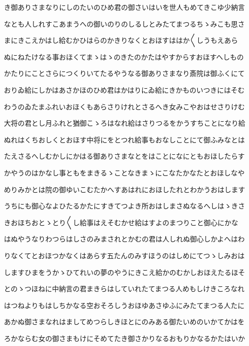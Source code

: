 \documentclass[a4paper,11pt,landscape]{ltjtarticle}
\begin{document}
\par\medskip
き御ありさまなりにしのたいのひめ君の御さいはいを世人もめてきこゆ少納言
\par\medskip
なとも人しれすこあまうへの御いのりのしるしとみたてまつるちゝみこも思さ
\par\medskip
まにきこえかはし給むかひはらのかきりなくとおほすははか〱しうもえあら
\par\medskip
ぬにねたけなる事おほくてまゝはゝのきたのかたはやすからすおほすへしもの
\par\medskip
かたりにことさらにつくりいてたるやうなる御ありさまなり斎院は御ふくにて
\par\medskip
おりゐ給にしかはあさかほのひめ君はかはりにゐ給にきかものいつきにはそむ
\par\medskip
わうのゐたまふれいおほくもあらさりけれとさるへき女みこやおはせさりけむ
\par\medskip
大将の君とし月ふれと猶御こゝろはなれ給はさりつるをかうすちことになり給
\par\medskip
ぬれはくちおしくとおほす中将にをとつれ給事もおなしことにて御ふみなとは
\par\medskip
たえさるへしむかしにかはる御ありさまなとをはことになにともおほしたらす
\par\medskip
かやうのはかなし事ともをまきるゝことなきまゝにこなたかなたとおほしなや
\par\medskip
めりみかとは院の御ゆいこむたかへすあはれにおほしたれとわかうおはします
\par\medskip
うちにも御心なよひたるかたにすきてつよき所おはしまさぬなるへしはゝきさ
\par\medskip
きおほちおとゝとり〱し給事はえそむかせ給はすよのまつりこと御心にかな
\par\medskip
はぬやうなりわつらはしさのみまされとかむの君は人しれぬ御心しかよへはわ
\par\medskip
りなくてとおほつかなくはあらす五たんのみすほうのはしめにてつゝしみおは
\par\medskip
しますひまをうかゝひてれいの夢のやうにきこえ給かのむかしおほえたるほそ
\par\medskip
とのゝつほねに中納言の君まきらはしていれたてまつる人めもしけきころなれ
\par\medskip
はつねよりもはしちかなる空おそろしうおほゆあさゆふにみたてまつる人たに
\par\medskip
あかぬ御さまなれはましてめつらしきほとにのみある御たいめのいかてかはを
\par\medskip
ろかならむ女の御さまもけにそめてたき御さかりなるおもりかなるかたはいか
\end{document}
